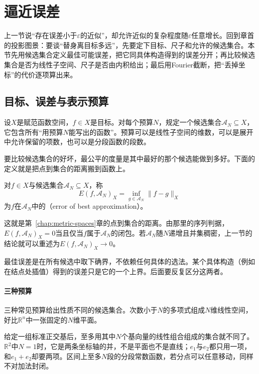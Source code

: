 \section{逼近误差}
\label{sec:fapprox-error}

上一节说“存在误差小于$\varepsilon$的近似”，却允许近似的复杂程度随$\varepsilon$任意增长。回到章首的投影图景：要谈“替身离目标多远”，先要定下目标、尺子和允许的候选集合。本节先用候选集合定义最佳可能误差，把它同具体构造得到的误差分开；再比较候选集合是否为线性子空间、尺子是否由内积给出；最后用Fourier截断，把“丢掉坐标”的代价逐项算出来。

\subsection{目标、误差与表示预算}
\label{sec:fapprox-budget}

设$X$是赋范函数空间，$f\in X$是目标。对每个预算$N$，规定一个候选集合$\mathcal A_N\subseteq X$，它包含所有“用预算$N$能写出的函数”。预算可以是线性子空间的维数，可以是展开中允许保留的项数，也可以是分段函数的段数。

要比较候选集合的好坏，最公平的度量是其中最好的那个候选能做到多好。下面的定义就是把点到集合的距离搬到函数上。

\begin{definition}[最佳逼近误差]
\label{def:fapprox-best-error}
对$f\in X$与候选集合$\mathcal A_N\subseteq X$，称
\begin{equation}
 E(f,\mathcal A_N)_X=\inf_{g\in\mathcal A_N}\lVert f-g\rVert_X
 \label{eq:fapprox-best-error}
\end{equation}
为$f$在$\mathcal A_N$中的（error of best approximation）。
\end{definition}

这就是第~\ref{chap:metric-spaces}章的点到集合的距离。由那里的序列判据，$E(f,\mathcal A_N)_X=0$当且仅当$f$属于$\mathcal A_N$的闭包。若$\mathcal A_N$随$N$递增且并集稠密，上一节的结论就可以重述为$E(f,\mathcal A_N)_X\to0$。

最佳误差是在所有候选中取下确界，不依赖任何具体的选法。某个具体构造（例如在结点处插值）得到的误差只是它的一个上界。后面要反复区分这两者。

\paragraph{三种预算}
三种常见预算给出性质不同的候选集合。次数小于$N$的多项式组成$N$维线性空间，好比$\mathbb R^n$中一张固定的$N$维平面。

给定一组标准正交基后，至多用其中$N$个基向量的线性组合组成的集合就不同了。$\mathbb R^2$中$N=1$时，它是两条坐标轴的并，不是平面也不是直线；$e_1$与$e_2$都只用一项，和$e_1+e_2$却要两项。区间上至多$N$段的分段常数函数，若分点可以任意移动，同样不对加法封闭。

